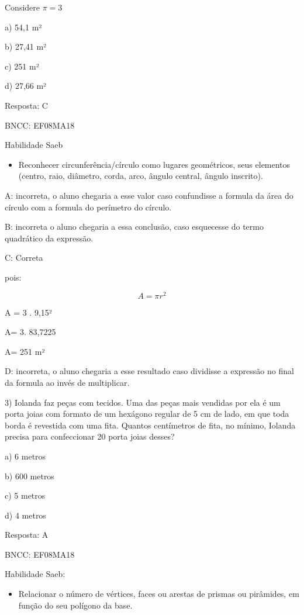 Considere \(\pi = 3\)

a) 54,1 m²

b) 27,41 m²

c) 251 m²

d) 27,66 m²

Resposta: C

BNCC: EF08MA18

Habilidade Saeb

\begin{itemize}
\tightlist
\item
  Reconhecer circunferência/círculo como lugares geométricos, seus
  elementos (centro, raio, diâmetro, corda, arco, ângulo central, ângulo
  inscrito).
\end{itemize}

A: incorreta, o aluno chegaria a esse valor caso confundisse a formula
da área do círculo com a formula do perímetro do círculo.

B: incorreta o aluno chegaria a essa conclusão, caso esquecesse do termo
quadrático da expressão.

C: Correta

pois:

\[A = \pi r^{2}\]

A = 3 . 9,15²

A= 3. 83,7225

A= 251 m²

D: incorreta, o aluno chegaria a esse resultado caso dividisse a
expressão no final da formula ao invés de multiplicar.

3) Iolanda faz peças com tecidos. Uma das peças mais vendidas por ela é
um porta joias com formato de um hexágono regular de 5 cm de lado, em
que toda borda é revestida com uma fita. Quantos centímetros de fita, no
mínimo, Iolanda precisa para confeccionar 20 porta joias desses?

a) 6 metros

b) 600 metros

c) 5 metros

d) 4 metros

Resposta: A

BNCC: EF08MA18

Habilidade Saeb:

\begin{itemize}
\tightlist
\item
  Relacionar o número de vértices, faces ou arestas de prismas ou
  pirâmides, em função do seu polígono da base.
\end{itemize}

